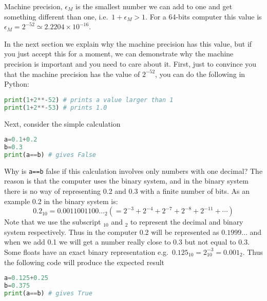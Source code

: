 \documentclass[graybox,sectrefs,envcountresetchap,open=right,final]{svmonodo}
\newenvironment{graybox2admon}[1][]{
\begin{graybox2mdframed}[frametitle=#1]
}
{
\end{graybox2mdframed}
}
\begin{document}
\begin{graybox2admon}[Machine Precision]
Machine precision, $\epsilon_M$ is the smallest number we can add to one and get something different than one, i.e.~$1+\epsilon_M>1$. For a 64-bits computer this value is $\epsilon_M=2^{-52}\simeq2.2204\times10^{-16}$.
\end{graybox2admon}



In the next section we explain why the machine precision has this value, but if you just accept this for a moment, we can demonstrate why the machine precision is important and you need to care about it. First, just to convince you that the machine precision has the value of $2^{-52}$, you can do the following in Python:



\begin{lstlisting}[language=python,style=blue1bar]
print(1+2**-52) # prints a value larger than 1
print(1+2**-53) # prints 1.0

\end{lstlisting}

Next, consider the simple calculation




\begin{lstlisting}[language=python,style=blue1bar]
a=0.1+0.2
b=0.3
print(a==b) # gives False

\end{lstlisting}

Why is \texttt{a==b} false if this calculation involves only numbers with one decimal? The reason is that the computer uses the binary system, and in the binary system there is no way of representing 0.2 and 0.3 with a finite number of bits. As an example 0.2 in the binary system is:
\begin{equation}
0.2_{10}=0.0011001100\ldots_2 (=2^{-3}+2^{-4}+2^{-7}+2^{-8}+2^{-11}+\cdots)
\label{eq:taylor:02}
\end{equation}
Note that we use the subscript $_{10}$ and $_2$ to represent the decimal and binary system respectively.
Thus in the computer 0.2 will be represented as $0.1999\ldots$ and when we add 0.1 we will get a number really close to 0.3 but not equal to 0.3. Some floats have an exact binary representation e.g.~$0.125_{10}=2^{-3}_{10}=0.001_2$. Thus the following code will produce the expected result




\begin{lstlisting}[language=python,style=blue1bar]
a=0.125+0.25
b=0.375
print(a==b) # gives True

\end{lstlisting}
\end{document}
